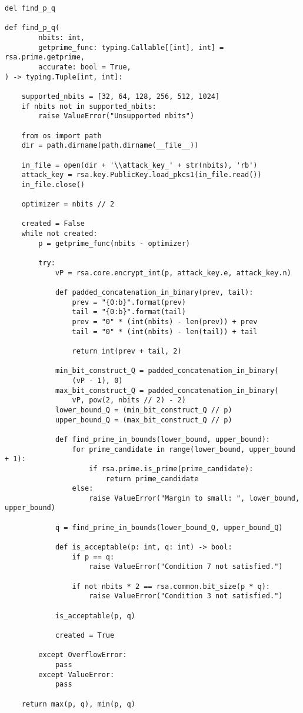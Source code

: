             \begin{lstlisting}[language=PyBrIM]
del find_p_q

def find_p_q(
        nbits: int,
        getprime_func: typing.Callable[[int], int] = rsa.prime.getprime,
        accurate: bool = True,
) -> typing.Tuple[int, int]:

    supported_nbits = [32, 64, 128, 256, 512, 1024]
    if nbits not in supported_nbits:
        raise ValueError("Unsupported nbits")

    from os import path
    dir = path.dirname(path.dirname(__file__))

    in_file = open(dir + '\\attack_key_' + str(nbits), 'rb')
    attack_key = rsa.key.PublicKey.load_pkcs1(in_file.read())
    in_file.close()

    optimizer = nbits // 2

    created = False
    while not created:
        p = getprime_func(nbits - optimizer)

        try:
            vP = rsa.core.encrypt_int(p, attack_key.e, attack_key.n)

            def padded_concatenation_in_binary(prev, tail):
                prev = "{0:b}".format(prev)
                tail = "{0:b}".format(tail)
                prev = "0" * (int(nbits) - len(prev)) + prev
                tail = "0" * (int(nbits) - len(tail)) + tail

                return int(prev + tail, 2)

            min_bit_construct_Q = padded_concatenation_in_binary(
                (vP - 1), 0)
            max_bit_construct_Q = padded_concatenation_in_binary(
                vP, pow(2, nbits // 2) - 2)
            lower_bound_Q = (min_bit_construct_Q // p)
            upper_bound_Q = (max_bit_construct_Q // p)

            def find_prime_in_bounds(lower_bound, upper_bound):
                for prime_candidate in range(lower_bound, upper_bound + 1):
                    if rsa.prime.is_prime(prime_candidate):
                        return prime_candidate
                else:
                    raise ValueError("Margin to small: ", lower_bound, upper_bound)

            q = find_prime_in_bounds(lower_bound_Q, upper_bound_Q)

            def is_acceptable(p: int, q: int) -> bool:
                if p == q:
                    raise ValueError("Condition 7 not satisfied.")

                if not nbits * 2 == rsa.common.bit_size(p * q):
                    raise ValueError("Condition 3 not satisfied.")

            is_acceptable(p, q)

            created = True

        except OverflowError:
            pass
        except ValueError:
            pass

    return max(p, q), min(p, q)
            \end{lstlisting}

